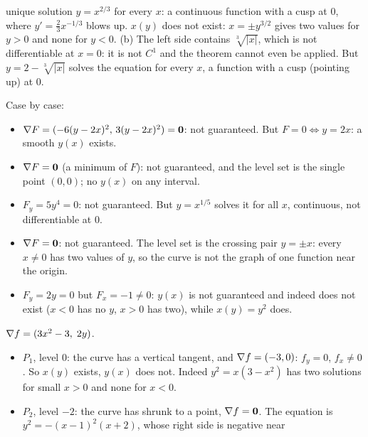\begin{solutions}
        unique solution $y=x^{2/3}$ for every $x$: a continuous function
        with a cusp at $0$, where $y'=\tfrac23x^{-1/3}$ blows up. $x(y)$
        does not exist: $x=\pm y^{3/2}$ gives two values for $y>0$ and none
        for $y<0$. (b) The left side contains $\sqrt[3]{|x|}$, which is not
        differentiable at $x=0$: it is not $C^{1}$ and the theorem cannot
        even be applied. But $y=2-\sqrt[3]{|x|}$ solves the equation for
        every $x$, a function with a cusp (pointing up) at $0$.
  \item Case by case:
        \begin{itemize}[leftmargin=1.2em,itemsep=0.2ex]
          \item[(a)] $\nabla F=(-6(y-2x)^{2},\,3(y-2x)^{2})=\mathbf{0}$: not
                guaranteed. But $F=0\iff y=2x$: a smooth $y(x)$ exists.
          \item[(b)] $\nabla F=\mathbf{0}$ (a minimum of $F$): not
                guaranteed, and the level set is the single point
                $(0,0)$; no $y(x)$ on any interval.
          \item[(c)] $F_{y}=5y^{4}=0$: not guaranteed. But $y=x^{1/5}$
                solves it for all $x$, continuous, not differentiable at
                $0$.
          \item[(d)] $\nabla F=\mathbf{0}$: not guaranteed. The level set is
                the crossing pair $y=\pm x$: every $x\neq0$ has two values
                of $y$, so the curve is not the graph of one function near
                the origin.
          \item[(e)] $F_{y}=2y=0$ but $F_{x}=-1\neq0$: $y(x)$ is not
                guaranteed and indeed does not exist ($x<0$ has no $y$,
                $x>0$ has two), while $x(y)=y^{2}$ does.
        \end{itemize}
  \item $\nabla f=(3x^{2}-3,\;2y)$.
        \begin{itemize}[leftmargin=1.2em,itemsep=0.2ex]
          \item $P_{1}$, level $0$: the curve has a vertical tangent, and
                $\nabla f=(-3,0)$: $f_{y}=0$, $f_{x}\neq0$. So $x(y)$ exists,
                $y(x)$ does not. Indeed $y^{2}=x(3-x^{2})$ has two
                solutions for small $x>0$ and none for $x<0$.
          \item $P_{2}$, level $-2$: the curve has shrunk to a point,
                $\nabla f=\mathbf{0}$. The equation is
                $y^{2}=-(x-1)^{2}(x+2)$, whose right side is negative near

\end{itemize}
\end{solutions}
